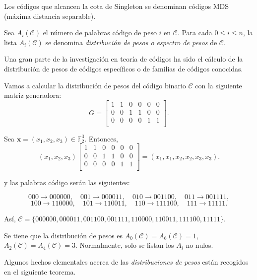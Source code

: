 Los códigos que alcancen la cota de Singleton se denominan códigos MDS (máxima distancia separable).

\begin{definicion}
  Sea $A_i\mathcal{(C)}$ el número de palabras código de peso $i$ en $\mathcal{C}$. Para cada $0 \leq i \leq n$, la lista $A_i(\mathcal{C})$ se denomina \emph{distribución de pesos o espectro de pesos} de $\mathcal{C}$.
\end{definicion}

Una gran parte de la investigación en teoría de códigos ha sido el cálculo de la distribución de pesos de códigos específicos o de familias de códigos conocidas.

\begin{ejemplo}
Vamos a calcular la distribución de pesos del código binario $\mathcal{C}$ con la siguiente matriz generadora:
$$G = \left[\begin{array}{cccccc}
  1&1&0&0&0&0\\
  0&0&1&1&0&0\\
  0&0&0&0&1&1\\
  \end{array}\right]. $$

  Sea $\mathbf{x} = (x_1,x_2,x_3) \in \mathds{F}_{2}^3$. Entonces, 
  $$(x_1,x_2,x_3)\left[\begin{array}{cccccc}
    1&1&0&0&0&0\\
    0&0&1&1&0&0\\
    0&0&0&0&1&1\\
    \end{array}\right] = (x_1,x_1,x_2,x_2,x_3,x_3). $$

  y las palabras código serán las siguientes:

  $$ 000 \rightarrow 000000, \quad		001 \rightarrow 000011, \quad			010 \rightarrow 001100, \quad			011 \rightarrow 001111,$$
  $$ 100 \rightarrow 110000, \quad		101 \rightarrow 110011, \quad			110 \rightarrow 111100, \quad			111 \rightarrow 11111.$$

  Así, $\mathcal{C} = \{000000,000011,001100,001111,110000,110011,111100,11111\}$.

  Se tiene que la distribución de pesos es $A_0(\mathcal{C}) = A_6(\mathcal{C}) = 1 $, $A_2(\mathcal{C}) = A_4(\mathcal{C}) = 3 $. Normalmente, solo se listan los $A_i$ no nulos.
\end{ejemplo}

Algunos hechos elementales acerca de las \emph{distribuciones de pesos} están recogidos en el siguiente teorema.

